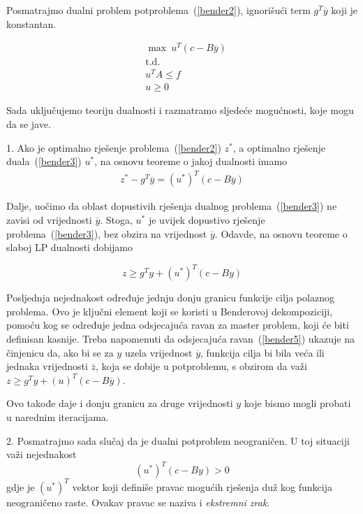 \documentclass[a4paper, utf8, 11pt, colorlinks]{book}
\theoremstyle{definition}
\begin{document}
 
Posmatrajmo dualni problem potproblema~(\ref{bender2}), ignorišući term $g^T\overline{y}$ koji je konstantan.

\begin{equation}
	\begin{aligned}\label{bender3}
	&\max\ u^T (c-B\overline{y})\\
 		& \mbox{t.d.}\\
	&u^TA\leqslant f\\
	&u\geqslant 0
 \end{aligned}
\end{equation}


Sada uključujemo teoriju dualnosti i razmatramo sljedeće mogućnosti, koje mogu da se jave.
 
1. Ako je optimalno rješenje problema~(\ref{bender2}) $z^*$, a optimalno rješenje duala~(\ref{bender3}) $u^*$, na osnovu teoreme o jakoj  dualnosti imamo
  \begin{equation}
	\begin{aligned}\label{bender4}
z^*-g^T\overline{y}=(u^*)^T(c-B\overline{y})
	\end{aligned}
\end{equation}


Dalje, uočimo da oblast dopustivih rješenja dualnog problema~(\ref{bender3}) ne zavisi od vrijednosti $\overline{y}$. Stoga, $u^*$ je uvijek dopustivo rješenje problema~(\ref{bender3}), bez obzira na vrijednost $\overline{y}$. Odavde, na osnovu teoreme o slaboj LP dualnosti dobijamo

  \begin{equation}
\label{bender5}
		z\geqslant g^Ty+(u^*)^T(c-By)
\end{equation}


Posljednja nejednakost određuje jednju donju granicu funkcije cilja polaznog problema. Ovo je ključni element koji se koristi u Benderovoj dekompoziciji, pomoću kog se određuje jedna odsjecajuća ravan za master problem, koji će biti definisan kasnije. Treba napomenuti da odsjecajuća ravan~(\ref{bender5}) ukazuje na činjenicu da, ako bi se za $y$ uzela vrijednost $\overline{y}$, funkcija cilja bi bila veća ili jednaka vrijednosti $\overline{z}$, koja se dobije u potproblemu, s obzirom da važi $	z\geqslant g^Ty+(u)^T(c-B\overline{y})$.

Ovo takođe daje i donju granicu za druge vrijednosti $y$ koje bismo mogli probati u narednim iteracijama.

2. Posmatrajmo sada slučaj da je dualni potproblem neograničen. U toj situaciji važi nejednakost
\begin{equation}
	\label{bender6}
	(u^*)^T(c-By)>0
\end{equation}
gdje je ${(u^*)}^T$ vektor koji definiše pravac mogućih rješenja duž kog funkcija neograničeno raste. Ovakav pravac se naziva i \emph{ekstremni zrak}.
\end{document}
